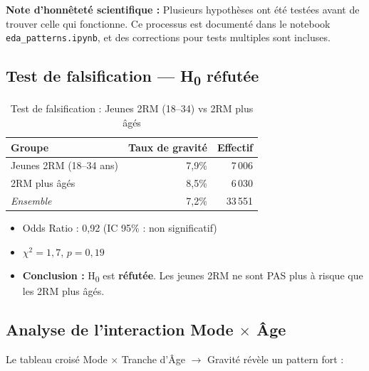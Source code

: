 \documentclass[12pt,a4paper]{article}
\begin{document}
\textbf{Note d'honnêteté scientifique :} Plusieurs hypothèses ont été
testées avant de trouver celle qui fonctionne. Ce processus est documenté
dans le notebook \texttt{eda\_patterns.ipynb}, et des corrections pour
tests multiples sont incluses.

\subsection{Test de falsification --- H\textsubscript{0} réfutée}

\begin{table}[H]
\centering
\caption{Test de falsification : Jeunes 2RM (18--34) vs 2RM plus âgés}
\label{tab:falsification}
\begin{tabular}{@{}l r r@{}}
\toprule
\textbf{Groupe} & \textbf{Taux de gravité} & \textbf{Effectif} \\
\midrule
Jeunes 2RM (18--34 ans) & 7,9\% & 7\,006 \\
2RM plus âgés           & 8,5\% & 6\,030 \\
\midrule
\textit{Ensemble}       & 7,2\% & 33\,551 \\
\bottomrule
\end{tabular}
\end{table}

\begin{itemize}
  \item Odds Ratio : 0,92 (IC 95\% : non significatif)
  \item $\chi^2 = 1,7$, $p = 0,19$
  \item \textbf{Conclusion :} H\textsubscript{0} est \textbf{réfutée}.
        Les jeunes 2RM ne sont PAS plus à risque que les 2RM plus âgés.
\end{itemize}

\subsection{Analyse de l'interaction Mode $\times$ \^Age}

Le tableau croisé Mode $\times$ Tranche d'\^Age $\rightarrow$ Gravité révèle
un pattern fort :
\end{document}
